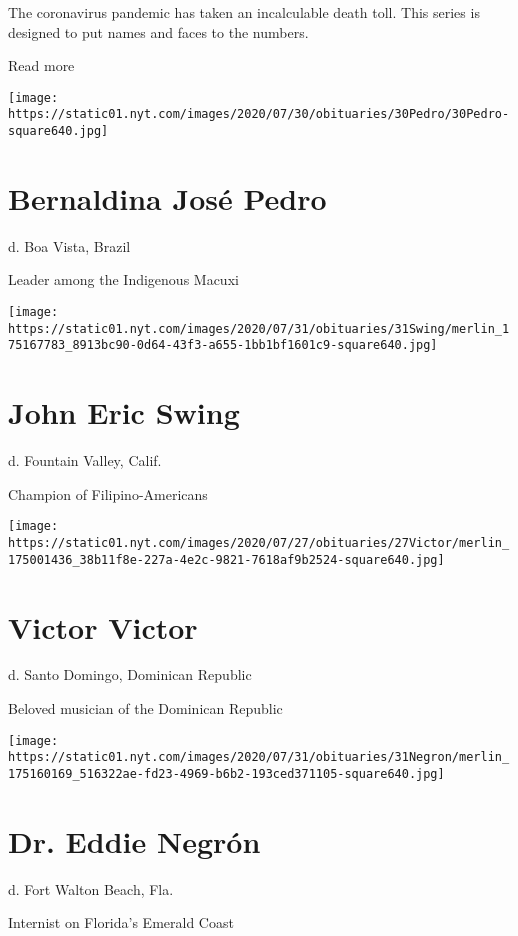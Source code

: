 The coronavirus pandemic has taken an incalculable death toll. This
series is designed to put names and faces to the numbers.

Read more

\texttt{[image: https://static01.nyt.com/images/2020/07/30/obituaries/30Pedro/30Pedro-square640.jpg]}

\hypertarget{bernaldina-josuxe9-pedro}{%
\section{Bernaldina José Pedro}\label{bernaldina-josuxe9-pedro}}

d. Boa Vista, Brazil

Leader among the Indigenous Macuxi

\texttt{[image: https://static01.nyt.com/images/2020/07/31/obituaries/31Swing/merlin\_175167783\_8913bc90-0d64-43f3-a655-1bb1bf1601c9-square640.jpg]}

\hypertarget{john-eric-swing}{%
\section{John Eric Swing}\label{john-eric-swing}}

d. Fountain Valley, Calif.

Champion of Filipino-Americans

\texttt{[image: https://static01.nyt.com/images/2020/07/27/obituaries/27Victor/merlin\_175001436\_38b11f8e-227a-4e2c-9821-7618af9b2524-square640.jpg]}

\hypertarget{victor-victor}{%
\section{Victor Victor}\label{victor-victor}}

d. Santo Domingo, Dominican Republic

Beloved musician of the Dominican Republic

\texttt{[image: https://static01.nyt.com/images/2020/07/31/obituaries/31Negron/merlin\_175160169\_516322ae-fd23-4969-b6b2-193ced371105-square640.jpg]}

\hypertarget{dr-eddie-negruxf3n}{%
\section{Dr. Eddie Negrón}\label{dr-eddie-negruxf3n}}

d. Fort Walton Beach, Fla.

Internist on Florida's Emerald Coast

